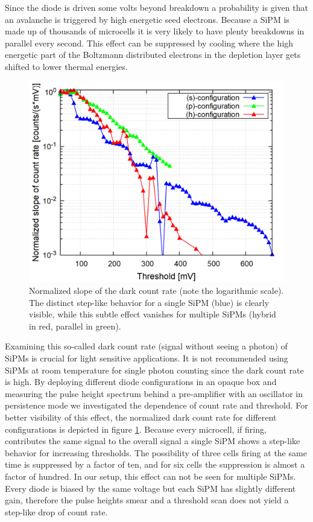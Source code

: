 \documentclass[12pt]{article}
\begin{document}
Since the diode is driven some volts beyond breakdown a probability is given that an avalanche is triggered by high energetic seed electrons. Because a SiPM is made up of thousands of microcells it is very likely to have plenty breakdowns in parallel every second. This effect can be suppressed by cooling where the high energetic part of the Boltzmann distributed electrons in the depletion layer gets shifted to lower thermal energies. \\ \indent
\begin{figure}[b!]
	\centering
	\includegraphics[width=0.9\linewidth]{./plots/dark_electron_spectrum/slope_countrate.png}
	\caption{Normalized slope of the dark count rate (note the logarithmic scale). The distinct step-like behavior for a single SiPM (blue) is clearly visible, while this subtle effect vanishes for multiple SiPMs (hybrid in red, parallel in green).}
	\label{fig:dark_count_rate}
\end{figure} 
Examining this so-called dark count rate (signal without seeing a photon) of SiPMs is crucial for light sensitive applications. It is not recommended using SiPMs at room temperature for single photon counting since the dark count rate is high. By deploying different diode configurations in an opaque box and measuring the pulse height spectrum behind a pre-amplifier with an oscillator in persistence mode we investigated the dependence of count rate and threshold. For better visibility of this effect, the normalized dark count rate for different configurations is depicted in figure \ref{fig:dark_count_rate}. Because every microcell, if firing, contributes the same signal to the overall signal a single SiPM shows a step-like behavior for increasing thresholds. The possibility of three cells firing at the same time is suppressed by a factor of ten, and for six cells the suppression is almost a factor of hundred. In our setup, this effect can not be seen for multiple SiPMs. Every diode is biased by the same voltage but each SiPM has slightly different gain, therefore the pulse heights smear and a threshold scan does not yield a step-like drop of count rate. \\ \indent
\end{document}
